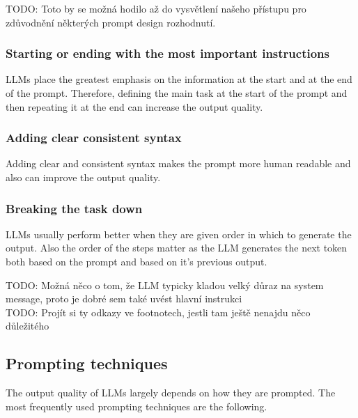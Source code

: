 TODO: Toto by se možná hodilo až do vysvětlení našeho přístupu pro zdůvodnění některých prompt design rozhodnutí. \\


\subsubsection{Starting or ending with the most important instructions}
LLMs place the greatest emphasis on the information at the start and at the end of the prompt. Therefore, defining the main task at the start of the prompt and then repeating it at the end can increase the output quality.


\subsubsection{Adding clear consistent syntax}
Adding clear and consistent syntax makes the prompt more human readable and also can improve the output quality.


\subsubsection{Breaking the task down}
LLMs usually perform better when they are given order in which to generate the output. Also the order of the steps matter as the LLM generates the next token both based on the prompt and based on it's previous output.



TODO: Možná něco o tom, že LLM typicky kladou velký důraz na system message, proto je dobré sem také uvést hlavní instrukci \\

TODO: Projít si ty odkazy ve footnotech, jestli tam ještě nenajdu něco důležitého \\


\subsection{Prompting techniques}

The output quality of LLMs largely depends on how they are prompted. The most frequently used prompting techniques are the following.


